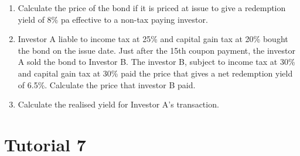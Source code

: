 \documentclass[
]{book}
\theoremstyle{definition}
\theoremstyle{definition}
\theoremstyle{definition}
\theoremstyle{definition}
\theoremstyle{remark}
\begin{document}
\begin{enumerate}
  \begin{enumerate}
  \def\labelenumii{\arabic{enumii}.}
  \item
    Calculate the price of the bond if it is priced at issue to give
    a redemption yield of 8\% pa effective to a non-tax paying
    investor.
  \item
    Investor A liable to income tax at 25\% and capital gain tax at
    20\% bought the bond on the issue date. Just after the 15th
    coupon payment, the investor A sold the bond to Investor B. The
    investor B, subject to income tax at 30\% and capital gain tax at
    30\% paid the price that gives a net redemption yield of 6.5\%.
    Calculate the price that investor B paid.
  \item
    Calculate the realised yield for Investor A's transaction.
  \end{enumerate}
\end{enumerate}

\section{Tutorial 7}\label{tutorial-7}
\end{document}
